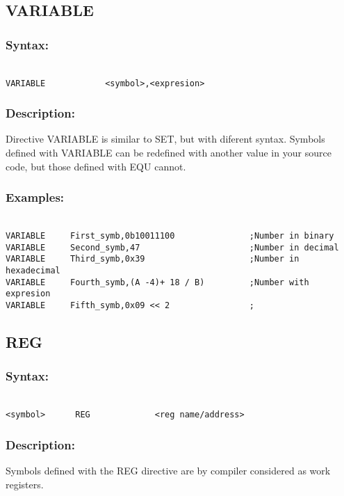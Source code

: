     \subsection{VARIABLE}
        \subsubsection{Syntax:}
        {
            ~\\
            \usecodefont        
            \verb'VARIABLE            <symbol>,<expresion>'
        }
        \subsubsection{Description:}
            Directive VARIABLE is similar to SET, but with diferent syntax. Symbols defined with VARIABLE can be redefined with another value in your source
            code, but those defined with EQU cannot.

        \subsubsection{Examples:}
        {
            ~\\
            \usecodefont
            \verb'VARIABLE     First_symb,0b10011100               ;Number in binary'\\
            \verb'VARIABLE     Second_symb,47                      ;Number in decimal'\\
            \verb'VARIABLE     Third_symb,0x39                     ;Number in hexadecimal'\\
            \verb'VARIABLE     Fourth_symb,(A -4)+ 18 / B)         ;Number with expresion'\\
            \verb'VARIABLE     Fifth_symb,0x09 << 2                ;'\\
        }

    \subsection{REG}
        \subsubsection{Syntax:}
        {
            ~\\
            \usecodefont        
            \verb'<symbol>      REG             <reg name/address>'
        }
            
        \subsubsection{Description:}
        Symbols defined with the REG directive are by compiler considered as work registers.

